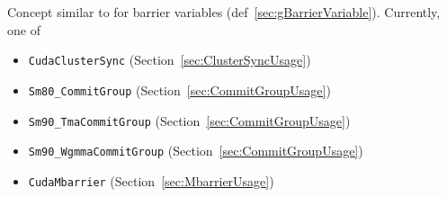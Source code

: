 
Concept similar to  for barrier variables (def~\ref{sec:gBarrierVariable}).
Currently, one of
\begin{itemize}
  \item \texttt{CudaClusterSync} (Section~\ref{sec:ClusterSyncUsage})
  \item \texttt{Sm80\_CommitGroup} (Section~\ref{sec:CommitGroupUsage})
  \item \texttt{Sm90\_TmaCommitGroup} (Section~\ref{sec:CommitGroupUsage})
  \item \texttt{Sm90\_WgmmaCommitGroup} (Section~\ref{sec:CommitGroupUsage})
  \item \texttt{CudaMbarrier} (Section~\ref{sec:MbarrierUsage})
\end{itemize}

